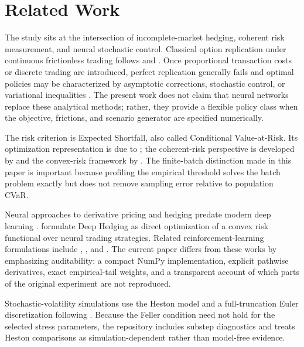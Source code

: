 \section{Related Work}
\label{sec:related}

The study sits at the intersection of incomplete-market hedging, coherent risk
measurement, and neural stochastic control. Classical option replication under
continuous frictionless trading follows \citet{blackscholes1973} and
\citet{merton1973}. Once proportional transaction costs or discrete trading are
introduced, perfect replication generally fails and optimal policies may be
characterized by asymptotic corrections, stochastic control, or variational
inequalities \citep{leland1985,hoggardwhalleywilmott1994,whalleywilmott1997}.
The present work does not claim that neural networks replace these analytical
methods; rather, they provide a flexible policy class when the objective,
frictions, and scenario generator are specified numerically.

The risk criterion is Expected Shortfall, also called Conditional
Value-at-Risk. Its optimization representation is due to
\citet{rockafellaruryasev2000}; the coherent-risk perspective is developed by
\citet{artzner1999} and the convex-risk framework by
\citet{follmerschied2002}. The finite-batch distinction made in this paper is
important because profiling the empirical threshold solves the batch problem
exactly but does not remove sampling error relative to population CVaR.

Neural approaches to derivative pricing and hedging predate modern deep
learning \citep{hutchinson1994}. \citet{buehler2019} formulate Deep Hedging as
direct optimization of a convex risk functional over neural trading
strategies. Related reinforcement-learning formulations include
\citet{kolmritter2019}, \citet{halperin2020}, and \citet{cao2021}. The current
paper differs from these works by emphasizing auditability: a compact NumPy
implementation, explicit pathwise derivatives, exact empirical-tail weights,
and a transparent account of which parts of the original experiment are not
reproduced.

Stochastic-volatility simulations use the Heston model \citep{heston1993} and
a full-truncation Euler discretization following \citet{lord2010}. Because the
Feller condition need not hold for the selected stress parameters, the
repository includes substep diagnostics and treats Heston comparisons as
simulation-dependent rather than model-free evidence.
